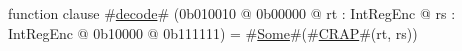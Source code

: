 function clause #\hyperref[zdecode]{decode}# (0b010010 @ 0b00000 @ rt : IntRegEnc @ rs : IntRegEnc @   0b10000 @ 0b111111) = #\hyperref[zSome]{Some}#(#\hyperref[zCRAP]{CRAP}#(rt, rs))
